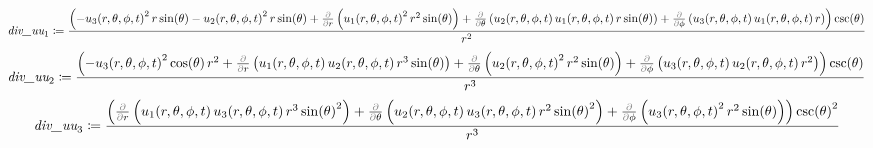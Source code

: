 \documentclass{article}
\begin{document}
\begin{dmath*}
\textit{div\_uu}_{1}\coloneqq \frac{\left(-u_{3}\! \left(r ,\theta ,\phi ,t \right)^{2} r \sin \! \left(\theta \right)-u_{2}\! \left(r ,\theta ,\phi ,t \right)^{2} r \sin \! \left(\theta \right)+\frac{\textcolor{gray}{\partial}}{\textcolor{gray}{\partial}r}\left(u_{1}\! \left(r ,\theta ,\phi ,t \right)^{2} r^{2} \sin \! \left(\theta \right)\right)+\frac{\textcolor{gray}{\partial}}{\textcolor{gray}{\partial}\theta}\left(u_{2}\! \left(r ,\theta ,\phi ,t \right) u_{1}\! \left(r ,\theta ,\phi ,t \right) r \sin \! \left(\theta \right)\right)+\frac{\textcolor{gray}{\partial}}{\textcolor{gray}{\partial}\phi}\left(u_{3}\! \left(r ,\theta ,\phi ,t \right) u_{1}\! \left(r ,\theta ,\phi ,t \right) r \right)\right) \csc \! \left(\theta \right)}{r^{2}}
\end{dmath*}
\vspace{-\bigskipamount}
\begin{dmath*}
\textit{div\_uu}_{2}\coloneqq \frac{\left(-u_{3}\! \left(r ,\theta ,\phi ,t \right)^{2} \cos \! \left(\theta \right) r^{2}+\frac{\textcolor{gray}{\partial}}{\textcolor{gray}{\partial}r}\left(u_{1}\! \left(r ,\theta ,\phi ,t \right) u_{2}\! \left(r ,\theta ,\phi ,t \right) r^{3} \sin \! \left(\theta \right)\right)+\frac{\textcolor{gray}{\partial}}{\textcolor{gray}{\partial}\theta}\left(u_{2}\! \left(r ,\theta ,\phi ,t \right)^{2} r^{2} \sin \! \left(\theta \right)\right)+\frac{\textcolor{gray}{\partial}}{\textcolor{gray}{\partial}\phi}\left(u_{3}\! \left(r ,\theta ,\phi ,t \right) u_{2}\! \left(r ,\theta ,\phi ,t \right) r^{2}\right)\right) \csc \! \left(\theta \right)}{r^{3}}
\end{dmath*}
\vspace{-\bigskipamount}
\begin{dmath}\label{(8)}
\textit{div\_uu}_{3}\coloneqq \frac{\left(\frac{\textcolor{gray}{\partial}}{\textcolor{gray}{\partial}r}\left(u_{1}\! \left(r ,\theta ,\phi ,t \right) u_{3}\! \left(r ,\theta ,\phi ,t \right) r^{3} \sin \! \left(\theta \right)^{2}\right)+\frac{\textcolor{gray}{\partial}}{\textcolor{gray}{\partial}\theta}\left(u_{2}\! \left(r ,\theta ,\phi ,t \right) u_{3}\! \left(r ,\theta ,\phi ,t \right) r^{2} \sin \! \left(\theta \right)^{2}\right)+\frac{\textcolor{gray}{\partial}}{\textcolor{gray}{\partial}\phi}\left(u_{3}\! \left(r ,\theta ,\phi ,t \right)^{2} r^{2} \sin \! \left(\theta \right)\right)\right) \csc \! \left(\theta \right)^{2}}{r^{3}}
\end{dmath}
\begin{Maple Normal}

\end{Maple Normal}
\end{document}
